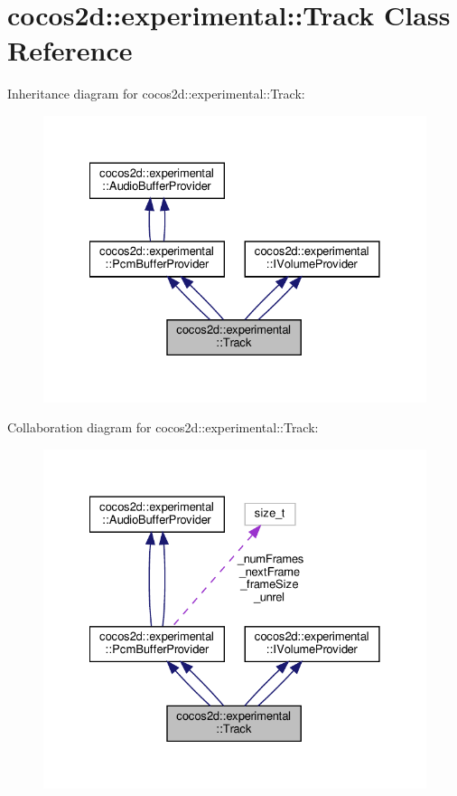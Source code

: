 \hypertarget{classcocos2d_1_1experimental_1_1Track}{}\section{cocos2d\+:\+:experimental\+:\+:Track Class Reference}
\label{classcocos2d_1_1experimental_1_1Track}


Inheritance diagram for cocos2d\+:\+:experimental\+:\+:Track\+:
\nopagebreak
\begin{figure}[H]
\begin{center}
\leavevmode
\includegraphics[width=328pt]{classcocos2d_1_1experimental_1_1Track__inherit__graph}
\end{center}
\end{figure}


Collaboration diagram for cocos2d\+:\+:experimental\+:\+:Track\+:
\nopagebreak
\begin{figure}[H]
\begin{center}
\leavevmode
\includegraphics[width=328pt]{classcocos2d_1_1experimental_1_1Track__coll__graph}
\end{center}
\end{figure}
